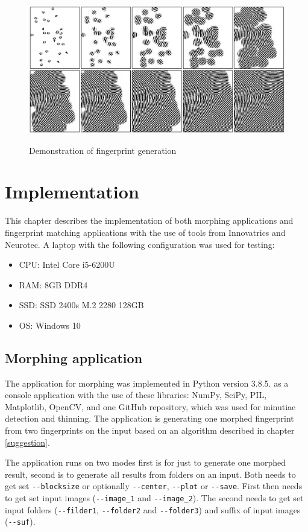 \begin{figure}[H]
    \centering
        {\includegraphics[width=1\linewidth]{obrazky-figures/gen2.png}}\\
        \caption{Demonstration of fingerprint generation \cite{syntetic_gen_paper}}
        \label{fig:syn}
\end{figure}

\chapter{Implementation}
This chapter describes the implementation of both morphing applications and fingerprint matching applications with the use of tools from Innovatrics and Neurotec. A laptop with the following configuration was used for testing:
\begin{itemize}
    \item CPU: Intel Core i5-6200U
    \item RAM: 8GB DDR4
    \item SSD: SSD 2400s M.2 2280 128GB
    \item OS: Windows 10
\end{itemize}

\label{mainmorph}
\section{Morphing application}
The application for morphing was implemented in Python version 3.8.5. as a console application with the use of these libraries: NumPy, SciPy, PIL, Matplotlib, OpenCV, and one GitHub repository, which was used for minutiae detection and thinning. The application is generating one morphed fingerprint from two fingerprints on the input based on an algorithm described in chapter \ref{suggestion}. 

The application runs on two modes first is for just to generate one morphed result, second is to generate all results from folders on an input. Both needs to get set \texttt{-{}-blocksize} or optionally \texttt{-{}-center}, \texttt{-{}-plot} or \texttt{-{}-save}. First then needs to get set input images (\texttt{-{}-image\_1} and \texttt{-{}-image\_2}). The second needs to get set input folders (\texttt{-{}-filder1}, \texttt{-{}-folder2} and \texttt{-{}-folder3}) and suffix of input images (\texttt{-{}-suf}).

